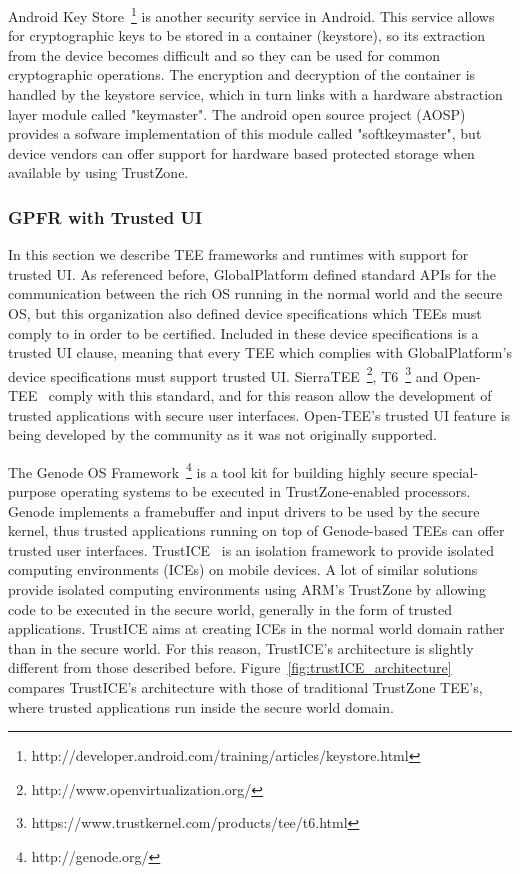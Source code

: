 Android Key Store~\footnote{http://developer.android.com/training/articles/keystore.html} is another security service in Android. This service allows for cryptographic keys to be stored in a container (keystore), so its extraction from the device becomes difficult and so they can be used for common cryptographic operations. The encryption and decryption of the container is handled by the keystore service, which in turn links with a hardware abstraction layer module called "keymaster". The android open source project (AOSP) provides a sofware implementation of this module called "softkeymaster", but device vendors can offer support for hardware based protected storage when available by using TrustZone.

\subsubsection{GPFR with Trusted UI}

In this section we describe TEE frameworks and runtimes with support for trusted UI. As referenced before, GlobalPlatform defined standard APIs for the communication between the rich OS running in the normal world and the secure OS, but this organization also defined device specifications which TEEs must comply to in order to be certified. Included in these device specifications is a trusted UI clause, meaning that every TEE which complies with GlobalPlatform's device specifications must support trusted UI. SierraTEE~\footnote{http://www.openvirtualization.org/}, T6~\footnote{https://www.trustkernel.com/products/tee/t6.html} and Open-TEE~\cite{mcgillion2015open} comply with this standard, and for this reason allow the development of trusted applications with secure user interfaces.
Open-TEE's trusted UI feature is being developed by the community as it was not originally supported.

The Genode OS Framework~\footnote{http://genode.org/} is a tool kit for building highly secure special-purpose operating systems to be executed in TrustZone-enabled processors. Genode implements a framebuffer and input drivers to be used by the secure kernel, thus trusted applications running on top of Genode-based TEEs can offer trusted user interfaces. TrustICE~\cite{sun2015trustice} is an isolation framework to provide isolated computing environments (ICEs) on mobile devices. A lot of similar solutions provide isolated computing environments using ARM's TrustZone by allowing code to be executed in the secure world, generally in the form of trusted applications. TrustICE aims at creating ICEs in the normal world domain rather than in the secure world. For this reason, TrustICE's architecture is slightly different from those described before. Figure~\ref{fig:trustICE_architecture} compares TrustICE's architecture with those of traditional TrustZone TEE's, where trusted applications run inside the secure world domain.

